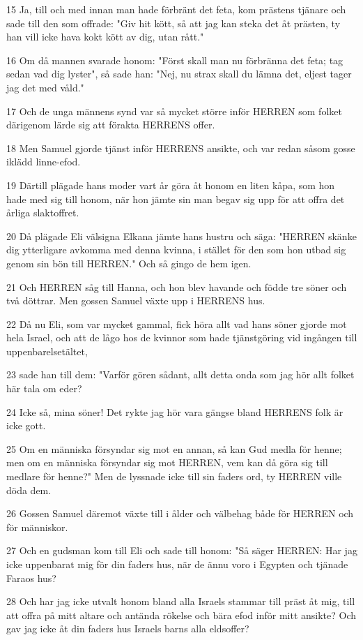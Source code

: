 \par 15 Ja, till och med innan man hade förbränt det feta, kom prästens tjänare och sade till den som offrade: "Giv hit kött, så att jag kan steka det åt prästen, ty han vill icke hava kokt kött av dig, utan rått."
\par 16 Om då mannen svarade honom: "Först skall man nu förbränna det feta; tag sedan vad dig lyster", så sade han: "Nej, nu strax skall du lämna det, eljest tager jag det med våld."
\par 17 Och de unga männens synd var så mycket större inför HERREN som folket därigenom lärde sig att förakta HERRENS offer.
\par 18 Men Samuel gjorde tjänst inför HERRENS ansikte, och var redan såsom gosse iklädd linne-efod.
\par 19 Därtill plägade hans moder vart år göra åt honom en liten kåpa, som hon hade med sig till honom, när hon jämte sin man begav sig upp för att offra det årliga slaktoffret.
\par 20 Då plägade Eli välsigna Elkana jämte hans hustru och säga: "HERREN skänke dig ytterligare avkomma med denna kvinna, i stället för den som hon utbad sig genom sin bön till HERREN." Och så gingo de hem igen.
\par 21 Och HERREN såg till Hanna, och hon blev havande och födde tre söner och två döttrar. Men gossen Samuel växte upp i HERRENS hus.
\par 22 Då nu Eli, som var mycket gammal, fick höra allt vad hans söner gjorde mot hela Israel, och att de lågo hos de kvinnor som hade tjänstgöring vid ingången till uppenbarelsetältet,
\par 23 sade han till dem: "Varför gören sådant, allt detta onda som jag hör allt folket här tala om eder?
\par 24 Icke så, mina söner! Det rykte jag hör vara gängse bland HERRENS folk är icke gott.
\par 25 Om en människa försyndar sig mot en annan, så kan Gud medla för henne; men om en människa försyndar sig mot HERREN, vem kan då göra sig till medlare för henne?" Men de lyssnade icke till sin faders ord, ty HERREN ville döda dem.
\par 26 Gossen Samuel däremot växte till i ålder och välbehag både för HERREN och för människor.
\par 27 Och en gudsman kom till Eli och sade till honom: "Så säger HERREN: Har jag icke uppenbarat mig för din faders hus, när de ännu voro i Egypten och tjänade Faraos hus?
\par 28 Och har jag icke utvalt honom bland alla Israels stammar till präst åt mig, till att offra på mitt altare och antända rökelse och bära efod inför mitt ansikte? Och gav jag icke åt din faders hus Israels barns alla eldsoffer?
